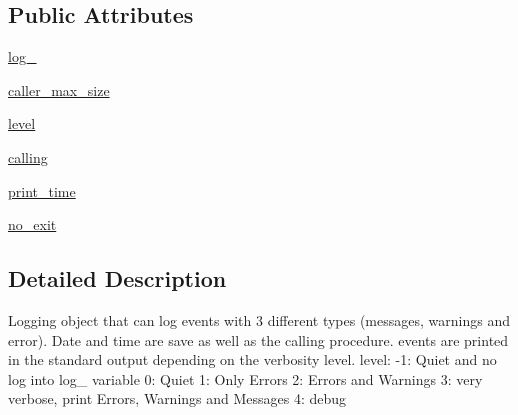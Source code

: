 \subsection*{Public Attributes}
\begin{DoxyCompactItemize}
\item 
\hyperlink{classpyneb_1_1utils_1_1logging_1_1my__logging_afd87151907f32bc0dc45f0171b61374e}{log\-\_\-}
\item 
\hyperlink{classpyneb_1_1utils_1_1logging_1_1my__logging_a1600d67de9d1d8f8c7036bd6909f9834}{caller\-\_\-max\-\_\-size}
\item 
\hyperlink{classpyneb_1_1utils_1_1logging_1_1my__logging_afde8e18a788ccc92fc61cab298bca7e3}{level}
\item 
\hyperlink{classpyneb_1_1utils_1_1logging_1_1my__logging_ab25fa7ebe84b603684dee62410c1e34c}{calling}
\item 
\hyperlink{classpyneb_1_1utils_1_1logging_1_1my__logging_a64ce0c908aacc650546490cf9750da97}{print\-\_\-time}
\item 
\hyperlink{classpyneb_1_1utils_1_1logging_1_1my__logging_a13a9674c8ab620cbbedd3939f475965a}{no\-\_\-exit}
\end{DoxyCompactItemize}


\subsection{Detailed Description}
\begin{DoxyVerb}Logging object that can log events with 3 different types (messages, warnings and error).
Date and time are save as well as the calling procedure.
events are printed in the standard output depending on the verbosity level.
level: -1: Quiet and no log into log_ variable
         0: Quiet
         1: Only Errors
         2: Errors and Warnings
         3: very verbose, print Errors, Warnings and Messages 
         4: debug\end{DoxyVerb}
 

